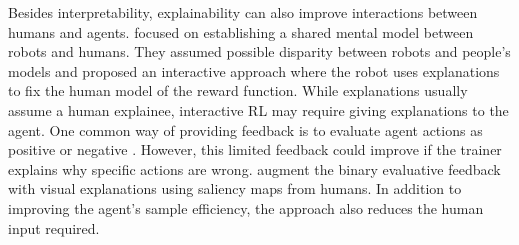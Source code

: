 \documentclass[twoside,11pt]{article}
\begin{document}
Besides interpretability, explainability can also improve interactions between humans and agents. \citet{TabrezHayes:2019:xRLTextualExplanations} focused on establishing a shared mental model between robots and humans. They assumed possible disparity between robots and people's models and proposed an interactive approach where the robot uses explanations to fix the human model of the reward function. While explanations usually assume a human explainee, interactive RL may require giving explanations to the agent. One common way of providing feedback is to evaluate agent actions as positive or negative \citep{Knox:2008:TAMER,knox:13,arakawa:18,macglashan2017interactive}. However, this limited feedback could improve if the trainer explains why specific actions are wrong. \cite{guan2020explanation} augment the binary evaluative feedback with visual explanations using saliency maps from humans. In addition to improving the agent's sample efficiency, the approach also reduces the human input required. 




\end{document}
